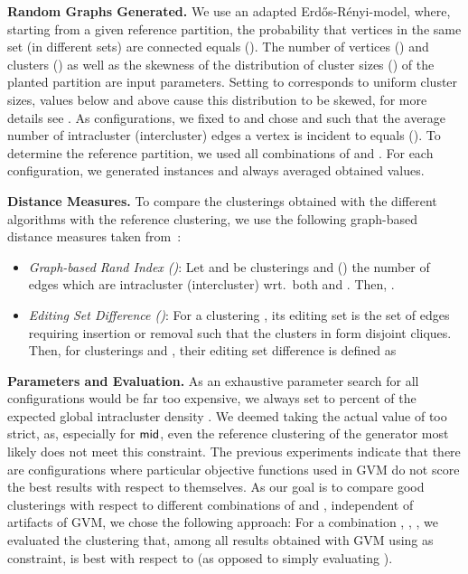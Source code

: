 \documentclass{llncs}
\newcommand{\measure}[1]{\ensuremath{\text{\normalfont{\sffamily {#1}}}}\xspace}
\newcommand{\andreapar}{\vspace*{.5ex}\par\noindent}
\begin{document}
\andreapar\textbf{Random Graphs Generated.}
We use an adapted Erd\H{o}s-R\'{e}nyi-model, where, starting from a given reference partition, the probability that vertices in the same set (in different sets) are connected equals  (). The number of vertices () and clusters () as well as the skewness of the distribution of cluster sizes () of the planted partition are input parameters.
Setting  to  corresponds to uniform cluster sizes, values below and above  cause this distribution to be skewed, for more details see \cite{gs-agdcr-09}. 
As configurations, we fixed  to  and chose  and  such that the average number of intracluster (intercluster) edges a vertex is incident to equals  (). 
To determine the reference partition, we used all combinations of  and .
For each configuration, we generated  instances and always averaged obtained values. \andreapar\textbf{Distance Measures.}
To compare the clusterings obtained with the different algorithms with the reference clustering, we use the following graph-based distance measures taken from~\cite{dggw-ecgc-08}:
\vspace{-1ex}
\begin{itemize}
\item \emph{Graph-based Rand Index ()}: Let  and  be clusterings and  () the number of edges which are intracluster (intercluster) wrt.\ both  and .
 Then, .
  \item \emph{Editing Set Difference ()}: For a clustering , its editing set  is the set of edges requiring insertion or removal such that the clusters in  form disjoint cliques. Then, for clusterings  and , their editing set difference is defined as
		
\end{itemize}
\vspace{-1ex}
\andreapar\textbf{Parameters and Evaluation.}
As an exhaustive parameter search for all configurations would be far too expensive, we always set  to  percent of the expected global intracluster density .
We deemed taking the actual value of  too strict, as, especially for \measure{mid}, even the reference clustering of the generator most likely does not meet this constraint.    
The previous experiments indicate that there are configurations where particular objective functions used in GVM do not score the best results with respect to themselves. 
As our goal is to compare good clusterings with respect to different combinations of  and , independent of artifacts of GVM, we chose the following approach:
For a combination , , , we evaluated the clustering that, among all results obtained with GVM using  as constraint, is best with respect to  (as opposed to simply evaluating ).
\end{document}
